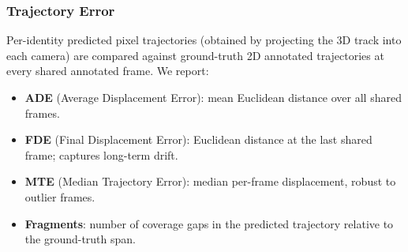 \subsubsection{Trajectory Error}
Per-identity predicted pixel trajectories (obtained by projecting the 3D track
into each camera) are compared against ground-truth 2D annotated trajectories at
every shared annotated frame.
We report:
\begin{itemize}
  \item \textbf{ADE} (Average Displacement Error): mean Euclidean distance over all
    shared frames.
  \item \textbf{FDE} (Final Displacement Error): Euclidean distance at the last
    shared frame; captures long-term drift.
  \item \textbf{MTE} (Median Trajectory Error): median per-frame displacement, robust
    to outlier frames.
  \item \textbf{Fragments}: number of coverage gaps in the predicted trajectory
    relative to the ground-truth span.
\end{itemize}
